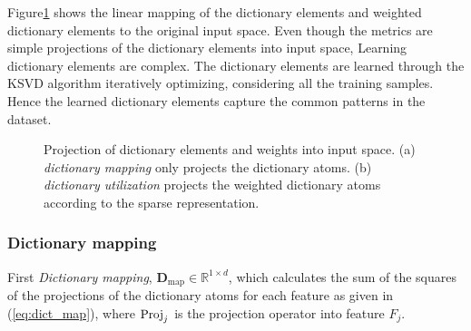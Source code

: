 Figure\ref{fig: D_metrics} shows the linear mapping of the dictionary elements and weighted dictionary elements to the original input space. Even though the metrics are simple projections of the dictionary elements into input space, Learning dictionary elements are complex. The dictionary elements are learned through the KSVD algorithm iteratively optimizing, considering all the training samples. Hence the learned dictionary elements capture the common patterns in the dataset. 


\begin{figure}[!t]%
\centering
{}\label{subfig: D_map}%
\qquad
{}\label{subfig: D_util}
\caption{Projection of dictionary elements and weights into input space. (a) \emph{dictionary mapping} only projects the dictionary atoms. (b) \emph{dictionary utilization} projects the weighted dictionary atoms according to the sparse representation.}%
\label{fig: D_metrics}%
\end{figure}


\subsubsection{Dictionary mapping}

First \emph{Dictionary mapping}, $\mathbf{D}_\textrm{map} \in \mathbb{R}^{1 \times d}$, which calculates the sum of the squares of the projections of the dictionary atoms for each feature as given in (\ref{eq:dict_map}), where $\operatorname*{Proj}_j$ is the projection operator into feature $F_j$. 

